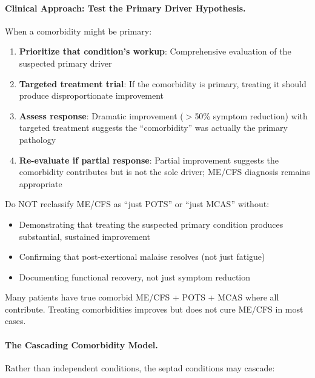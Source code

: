 \paragraph{Clinical Approach: Test the Primary Driver Hypothesis.}

When a comorbidity might be primary:
\begin{enumerate}
    \item \textbf{Prioritize that condition's workup}: Comprehensive evaluation of the suspected primary driver
    \item \textbf{Targeted treatment trial}: If the comorbidity is primary, treating it should produce disproportionate improvement
    \item \textbf{Assess response}: Dramatic improvement ($>$50\% symptom reduction) with targeted treatment suggests the ``comorbidity'' was actually the primary pathology
    \item \textbf{Re-evaluate if partial response}: Partial improvement suggests the comorbidity contributes but is not the sole driver; ME/CFS diagnosis remains appropriate
\end{enumerate}

\begin{warning}
\label{warn:reclassification}
Do NOT reclassify ME/CFS as ``just POTS'' or ``just MCAS'' without:
\begin{itemize}
    \item Demonstrating that treating the suspected primary condition produces substantial, sustained improvement
    \item Confirming that post-exertional malaise resolves (not just fatigue)
    \item Documenting functional recovery, not just symptom reduction
\end{itemize}
Many patients have true comorbid ME/CFS + POTS + MCAS where all contribute. Treating comorbidities improves but does not cure ME/CFS in most cases.
\end{warning}

\paragraph{The Cascading Comorbidity Model.}

Rather than independent conditions, the septad conditions may cascade:


